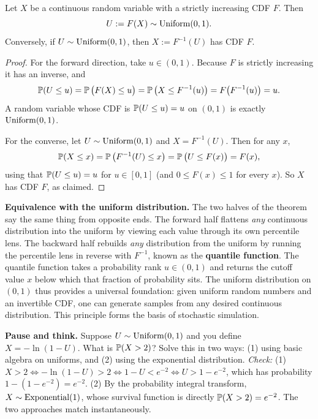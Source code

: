 \begin{theorem}
\label{ch16:pit-thm}
Let $X$ be a continuous random variable with a strictly increasing CDF $F$. Then
\[
  U := F(X) \sim \Unif(0,1).
\]
Conversely, if $U \sim \Unif(0,1)$, then $X := F^{-1}(U)$ has CDF $F$.
\end{theorem}

\begin{proof}
For the forward direction, take $u \in (0,1)$. Because $F$ is strictly increasing it has an
inverse, and
\[
  \P(U \le u) = \P\big(F(X) \le u\big) = \P\big(X \le F^{-1}(u)\big)
              = F\big(F^{-1}(u)\big) = u.
\]
A random variable whose CDF is $\P(U\le u) = u$ on $(0,1)$ is exactly $\Unif(0,1)$.

For the converse, let $U \sim \Unif(0,1)$ and $X = F^{-1}(U)$. Then for any $x$,
\[
  \P(X \le x) = \P\big(F^{-1}(U) \le x\big) = \P\big(U \le F(x)\big) = F(x),
\]
using that $\P(U \le u) = u$ for $u \in [0,1]$ (and $0 \le F(x) \le 1$ for every $x$). So $X$ has CDF $F$, as claimed.
\end{proof}

\begin{happeningbox}
\textbf{Equivalence with the uniform distribution.} The two halves of the theorem say
the same thing from opposite ends. The forward half flattens \emph{any} continuous
distribution into the uniform by viewing each value through its own percentile lens. The
backward half rebuilds \emph{any} distribution from the uniform by running the percentile
lens in reverse with $F^{-1}$, known as the \textbf{quantile function}. The quantile
function takes a probability rank $u \in (0,1)$ and returns the cutoff value $x$ below
which that fraction of probability sits. The uniform distribution on $(0,1)$ thus
provides a universal foundation: given uniform random numbers and an invertible CDF, one
can generate samples from any desired continuous distribution. This principle forms the
basis of stochastic simulation.
\end{happeningbox}

\begin{recoverybox}
\textbf{Pause and think.} Suppose $U \sim \Unif(0, 1)$ and you define $X = -\ln(1-U)$. What is
$\P(X > 2)$? Solve this in two ways: (1) using basic algebra on uniforms, and (2) using the
exponential distribution.
\emph{Check:} (1) $X > 2 \iff -\ln(1-U) > 2 \iff 1-U < e^{-2} \iff U > 1 - e^{-2}$, which has
probability $1 - (1 - e^{-2}) = e^{-2}$. (2) By the probability integral transform,
$X \sim \Expo(1)$, whose survival function is directly $\P(X > 2) = e^{-2}$. The two approaches
match instantaneously.
\end{recoverybox}

